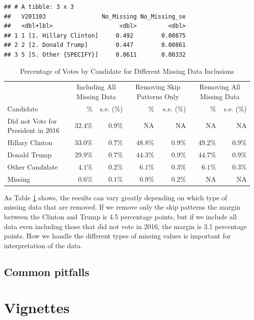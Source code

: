 \documentclass[
]{krantz}
\begin{document}
\begin{verbatim}
## # A tibble: 3 x 3
##   V201103                No_Missing No_Missing_se
##   <dbl+lbl>                   <dbl>         <dbl>
## 1 1 [1. Hillary Clinton]     0.492        0.00875
## 2 2 [2. Donald Trump]        0.447        0.00861
## 3 5 [5. Other {SPECIFY}]     0.0611       0.00332
\end{verbatim}



\begin{longtable}{lrrrrrr}
\caption{\label{tab:missing-anes-shadow-tab}Percentage of Votes by Candidate for Different Missing Data Inclusions}\\
\toprule
 & \multicolumn{2}{c}{Including All Missing Data} & \multicolumn{2}{c}{Removing Skip Patterns Only} & \multicolumn{2}{c}{Removing All Missing Data} \\ 
\cmidrule(lr){2-3} \cmidrule(lr){4-5} \cmidrule(lr){6-7}
Candidate & \% & s.e. (\%) & \% & s.e. (\%) & \% & s.e. (\%) \\ 
\midrule
Did not Vote for President in 2016 & $32.4\%$ & $0.9\%$ & NA & NA & NA & NA \\ 
Hillary Clinton & $33.0\%$ & $0.7\%$ & $48.8\%$ & $0.9\%$ & $49.2\%$ & $0.9\%$ \\ 
Donald Trump & $29.9\%$ & $0.7\%$ & $44.3\%$ & $0.9\%$ & $44.7\%$ & $0.9\%$ \\ 
Other Candidate & $4.1\%$ & $0.2\%$ & $6.1\%$ & $0.3\%$ & $6.1\%$ & $0.3\%$ \\ 
Missing & $0.6\%$ & $0.1\%$ & $0.9\%$ & $0.2\%$ & NA & NA \\ 
\bottomrule
\end{longtable}

As Table \ref{tab:missing-anes-shadow-tab} shows, the results can vary greatly depending on which type of missing data that are removed. If we remove only the skip patterns the margin between the Clinton and Trump is 4.5 percentage points, but if we include all data even including those that did not vote in 2016, the margin is 3.1 percentage points. How we handle the different types of missing values is important for interpretation of the data.

\hypertarget{c12-pitfalls}{%
\chapter{Common pitfalls}\label{c12-pitfalls}}

\hypertarget{part-vignettes}{%
\part{Vignettes}\label{part-vignettes}}
\end{document}
